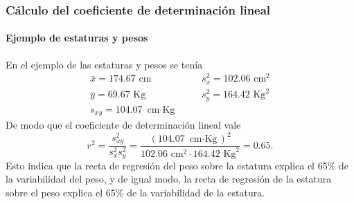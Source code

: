 \begin{frame}
\frametitle{Cálculo del coeficiente de determinación lineal}
\framesubtitle{Ejemplo de estaturas y pesos}
En el ejemplo de las estaturas y pesos se tenía
\[
\begin{array}{lll}
\bar x = 174.67 \mbox{ cm} & \quad & s^2_x = 102.06 \mbox{ cm}^2\\
\bar y = 69.67 \mbox{ Kg} & & s^2_y = 164.42 \mbox{ Kg}^2\\
s_{xy} = 104.07 \mbox{ cm$\cdot$Kg}
\end{array}
\]
De modo que el coeficiente de determinación lineal vale
\[
r^2 = \frac{s_{xy}^2}{s_x^2s_y^2} = \frac{(104.07 \mbox{ cm$\cdot$Kg})^2}{102.06 \mbox{ cm}^2 \cdot 164.42 \mbox{ Kg}^2} = 0.65.
\]
Esto indica que la recta de regresión del peso sobre la estatura explica el 65\% de la variabilidad del peso, y de igual modo, la recta de regresión de la estatura sobre el peso explica el  65\% de la variabilidad de la estatura.
\end{frame}


